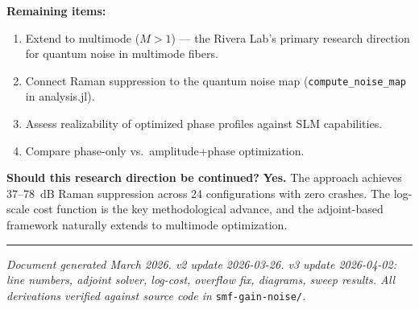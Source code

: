 \documentclass[12pt,a4paper]{article}
\theoremstyle{definition}
\begin{document}
\textbf{Remaining items:}
\begin{enumerate}[leftmargin=*]
\item Extend to multimode ($M > 1$) --- the Rivera Lab's primary research direction for quantum noise in multimode fibers.
\item Connect Raman suppression to the quantum noise map (\texttt{compute\_noise\_map} in analysis.jl).
\item Assess realizability of optimized phase profiles against SLM capabilities.
\item Compare phase-only vs.\ amplitude+phase optimization.
\end{enumerate}

\textbf{Should this research direction be continued?} \textcolor{green!60!black}{\textbf{Yes.}} The approach achieves 37--78~dB Raman suppression across 24 configurations with zero crashes. The log-scale cost function is the key methodological advance, and the adjoint-based framework naturally extends to multimode optimization.

\vspace{1em}
\hrule
\vspace{0.5em}
{\small\textit{Document generated March 2026. v2 update 2026-03-26. v3 update 2026-04-02: line numbers, adjoint solver, log-cost, overflow fix, diagrams, sweep results. All derivations verified against source code in} \texttt{smf-gain-noise/}\textit{.}}
\end{document}
